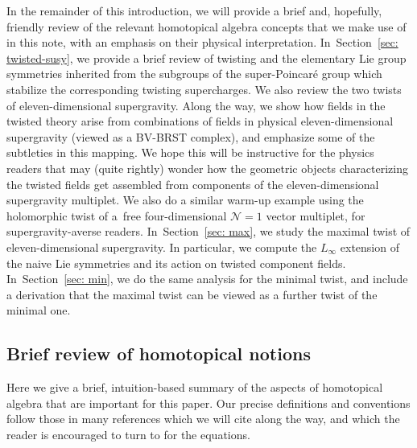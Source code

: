 \documentclass[pdftex]{sigma}
\numberwithin{equation}{section}
\theoremstyle{definition}
\begin{document}
In the remainder of this introduction, we will provide a brief and, hopefully, friendly review of the relevant homotopical algebra concepts that we make use of in this note, with an emphasis on their physical interpretation. In~Section~\ref{sec: twisted-susy}, we provide a brief review of twisting and the elementary Lie group symmetries inherited from the subgroups of the super-Poincar\'e group which stabilize the corresponding twisting supercharges. We also review the two twists of eleven-dimensional supergravity. Along the way, we show how fields in the twisted theory arise from combinations of fields in physical eleven-dimensional supergravity (viewed as a BV-BRST complex), and emphasize some of the subtleties in this mapping. We hope this will be instructive for the physics readers that may (quite rightly) wonder how the geometric objects characterizing the twisted fields get assembled from components of the eleven-dimensional supergravity multiplet. We also do a similar warm-up example using the holomorphic twist of a~free four-dimensional $\mathcal{N}=1$ vector multiplet, for supergravity-averse readers. In~Section~\ref{sec: max}, we study the maximal twist of eleven-dimensional supergravity. In particular, we compute the $L_{\infty}$ extension of the naive Lie symmetries and its action on twisted component fields. In~Section~\ref{sec: min}, we do the same analysis for the minimal twist, and include a derivation that the maximal twist can be viewed as a further twist of the minimal one.

\subsection{Brief review of homotopical notions} \label{sec: background}
Here we give a brief, intuition-based summary of the aspects of homotopical algebra that are important for this paper. Our precise definitions and conventions follow those in many references which we will cite along the way, and which the reader is encouraged to turn to for the equations.
\end{document}
